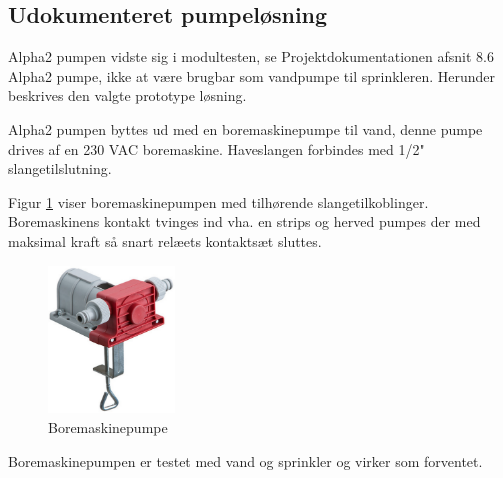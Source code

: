 
\subsection{Udokumenteret pumpeløsning}
\label{sec:Udokumenteretpumpeloesning}

Alpha2 pumpen vidste sig i modultesten, se Projektdokumentationen afsnit 8.6 Alpha2 pumpe, ikke at være brugbar som vandpumpe til sprinkleren. Herunder beskrives den valgte prototype løsning.

Alpha2 pumpen byttes ud med en boremaskinepumpe til vand, denne pumpe drives af en 230 VAC boremaskine. Haveslangen forbindes med 1/2" slangetilslutning. 

Figur \ref{fig:boremaskinepumpe} viser boremaskinepumpen med tilhørende slangetilkoblinger. Boremaskinens kontakt tvinges ind vha. en strips og herved pumpes der med maksimal kraft så snart relæets kontaktsæt sluttes. 

\begin{figure}[h]
  \centering
    \includegraphics[width=0.3\textwidth]{Billeder/boremaskinepumpe}
    \caption{Boremaskinepumpe}
    \label{fig:boremaskinepumpe}
\end{figure}

Boremaskinepumpen er testet med vand og sprinkler og virker som forventet. 